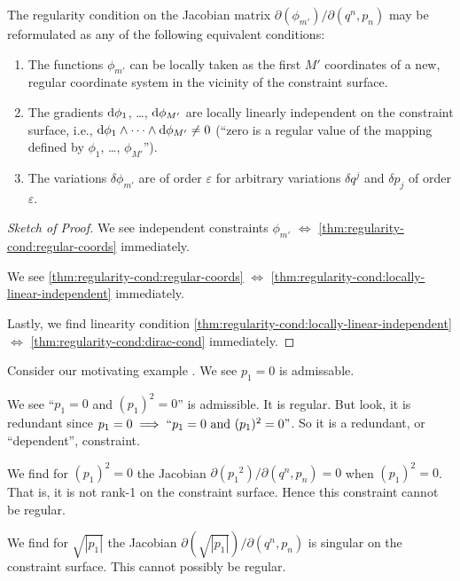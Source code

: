 \begin{theorem}
The regularity condition on the Jacobian matrix
$\partial(\phi_{m'})/\partial(q^{n},p_{n})$ may be reformulated as any
of the following equivalent conditions:
\begin{enumerate}
\item\label{thm:regularity-cond:regular-coords}
  The functions $\phi_{m'}$ can be locally taken as the first $M'$
  coordinates of a new, regular coordinate system in the vicinity of the
  constraint surface.
\item\label{thm:regularity-cond:locally-linear-independent}
  The gradients $\mathrm{d}\phi_{1}$, \dots, $\mathrm{d}\phi_{M'}$ are locally
  linearly independent on the constraint surface, i.e.,
  $\mathrm{d}\phi_{1}\wedge\cdots\wedge\mathrm{d}\phi_{M'}\neq0$ (``zero is a regular
  value of the mapping defined by $\phi_{1}$, \dots, $\phi_{M'}$'').
\item\label{thm:regularity-cond:dirac-cond}
  The variations $\delta\phi_{m'}$ are of order $\varepsilon$ for
  arbitrary variations $\delta q^{j}$ and $\delta p_{j}$ of order
  $\varepsilon$.
\end{enumerate}
\end{theorem}
\begin{proof}[Sketch of Proof]
We see independent constraints $\phi_{m'}$ $\iff$ \eqref{thm:regularity-cond:regular-coords}
immediately.

We see \eqref{thm:regularity-cond:regular-coords} $\iff$ \eqref{thm:regularity-cond:locally-linear-independent}
immediately.

Lastly, we find linearity condition \eqref{thm:regularity-cond:locally-linear-independent} $\iff$ \eqref{thm:regularity-cond:dirac-cond}
immediately.
\end{proof}

Consider our motivating example .
We see $p_{1}=0$ is admissable.

We see ``$p_{1}=0$ and $(p_{1})^{2}=0$'' is admissible. It is
regular. But look, it is redundant since $p_{1}=0\implies``p_{1}=0%
\mbox{\ and\ } (p_{1})^{2}=0"$. So it is a redundant, or ``dependent'',
constraint.

We find for $(p_{1})^{2}=0$ the Jacobian
$\partial({p_{1}}^{2})/\partial(q^{n}, p_{n})=0$ when
$(p_{1})^{2}=0$. That is, it is not rank-1 on the constraint
surface. Hence this constraint cannot be regular.

We find for $\sqrt{|p_{1}|}$ the Jacobian
$\partial(\sqrt{|p_{1}|})/\partial(q^{n},p_{n})$ is singular on the
constraint surface. This cannot possibly be regular.


